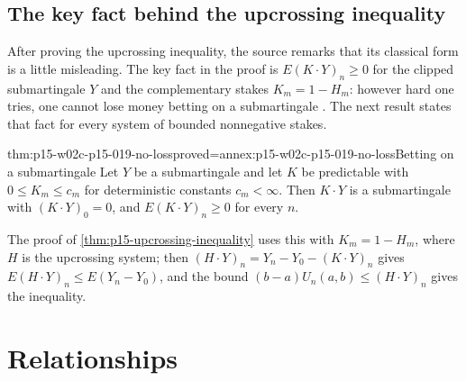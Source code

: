 \subsection*{The key fact behind the upcrossing inequality}

After proving the upcrossing inequality, the source remarks that its
classical form is a little misleading. The key fact in the proof is
\(E(K\cdot Y)_n\geq0\) for the clipped submartingale \(Y\) and the
complementary stakes \(K_m=1-H_m\): however hard one tries, one cannot
lose money betting on a submartingale
\cite[p.~221]{DurrettPTEAuthor2019}. The next result states that fact
for every system of bounded nonnegative stakes.

\begin{hbcorollary}{thm:p15-w02c-p15-019-no-loss}{proved=annex:p15-w02c-p15-019-no-loss}{Betting on a submartingale}
Let \(Y\) be a submartingale and let \(K\) be predictable with
\(0\leq K_m\leq c_m\) for deterministic constants \(c_m<\infty\). Then
\(K\cdot Y\) is a submartingale with \((K\cdot Y)_0=0\), and
\(E(K\cdot Y)_n\geq0\) for every \(n\).
\end{hbcorollary}

The proof of \cref{thm:p15-upcrossing-inequality} uses this with
\(K_m=1-H_m\), where \(H\) is the upcrossing system; then
\((H\cdot Y)_n=Y_n-Y_0-(K\cdot Y)_n\) gives
\(E(H\cdot Y)_n\leq E(Y_n-Y_0)\), and the bound
\((b-a)U_n(a,b)\leq(H\cdot Y)_n\) gives the inequality.

\section{Relationships}
\label{sec:p15-w02c-p15-019-relationships}

